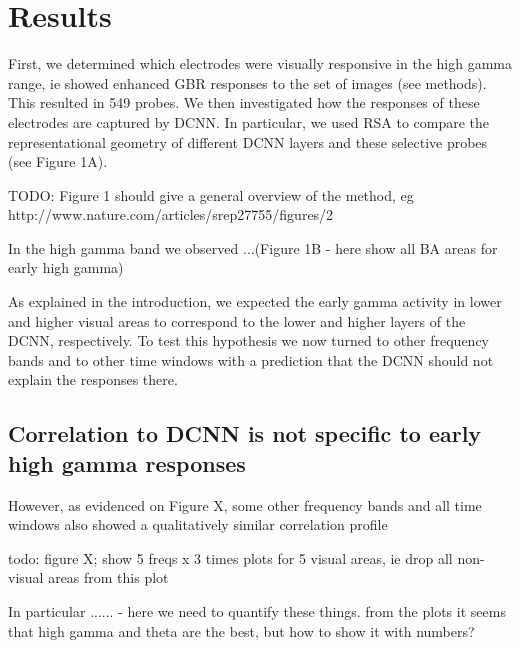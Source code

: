 \documentclass[final]{jneurosci}
\begin{document}
%
%
\section{Results}

First, we determined which electrodes were visually responsive in the high gamma range, ie showed enhanced GBR responses to the set of images (see methods). This resulted in 549 probes. We then investigated how the responses of these electrodes are captured by DCNN. In particular, we used RSA to compare the representational geometry of different DCNN layers and these selective probes (see Figure 1A).

TODO: Figure 1 should give a general overview of the method, eg http://www.nature.com/articles/srep27755/figures/2

In the high gamma band we observed ...(Figure 1B - here show all BA areas for early high gamma)

As explained in the introduction, we expected the early gamma activity in lower and higher visual areas to correspond to the lower and higher layers of the DCNN, respectively.  To test this hypothesis we now turned to other frequency bands and to other time windows with a prediction that the DCNN should not explain the responses there. 

\subsection{Correlation to DCNN is not specific to early high gamma responses}

However, as evidenced on Figure X, some other frequency bands and all time windows also showed a qualitatively similar correlation profile

todo: figure X; show 5 freqs x 3 times plots for 5 visual areas, ie drop all non-visual areas from this plot 

In particular ...... - here we need to quantify these things. from the plots it seems that high gamma and theta are the best, but how to show it with numbers?
\end{document}
